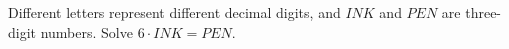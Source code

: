 Different letters represent different decimal digits, and $INK$ and $PEN$ are three-digit numbers. Solve $6\cdot INK=PEN$.
